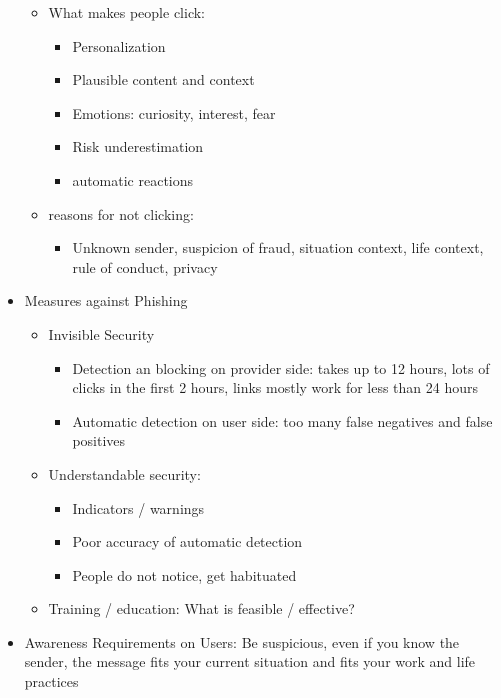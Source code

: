 \documentclass[a4paper,12pt]{scrartcl}
\begin{document}
\begin{itemize}
\begin{itemize}
			\item
				What makes people click:
				\begin{itemize}
					\item
						Personalization
					\item
						Plausible content and context
					\item
						Emotions: curiosity, interest, fear
					\item
						Risk underestimation
					\item
						automatic reactions
				\end{itemize}
			\item
				reasons for not clicking:
				\begin{itemize}
					\item
						Unknown sender, suspicion of fraud, situation context, life context, rule of conduct, privacy
				\end{itemize}
		\end{itemize}
	\item
		Measures against Phishing
		\begin{itemize}
			\item
				Invisible Security
				\begin{itemize}
					\item
						Detection an blocking on provider side: takes up to 12 hours, lots of clicks in the first 2 hours, links  mostly work for less than 24 hours
					\item
						Automatic detection on user side: too many false negatives and false positives
				\end{itemize}
			\item
				Understandable security:
				\begin{itemize}
					\item
						Indicators / warnings
					\item
						Poor accuracy of automatic detection
					\item
						People do not notice, get habituated
				\end{itemize}
			\item
				Training / education: What is feasible / effective?
		\end{itemize}
	\item
		Awareness Requirements on Users: Be suspicious, even if you know the sender, the message fits your current situation and fits your work and life practices


\end{itemize}
\end{document}
